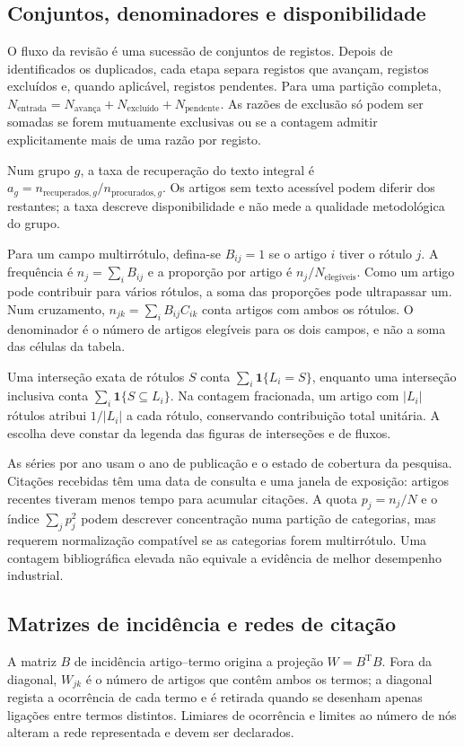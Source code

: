 \subsection{Conjuntos, denominadores e disponibilidade}
\label{sec:mat-contagens}
O fluxo da revisão é uma sucessão de conjuntos de registos. Depois de identificados os duplicados, cada etapa separa registos que avançam, registos excluídos e, quando aplicável, registos pendentes. Para uma partição completa, $N_{\mathrm{entrada}}=N_{\mathrm{avança}}+N_{\mathrm{excluído}}+N_{\mathrm{pendente}}$. As razões de exclusão só podem ser somadas se forem mutuamente exclusivas ou se a contagem admitir explicitamente mais de uma razão por registo.

Num grupo $g$, a taxa de recuperação do texto integral é $a_g=n_{\mathrm{recuperados},g}/n_{\mathrm{procurados},g}$. Os artigos sem texto acessível podem diferir dos restantes; a taxa descreve disponibilidade e não mede a qualidade metodológica do grupo.

Para um campo multirrótulo, defina-se $B_{ij}=1$ se o artigo $i$ tiver o rótulo $j$. A frequência é $n_j=\sum_iB_{ij}$ e a proporção por artigo é $n_j/N_{\mathrm{elegíveis}}$. Como um artigo pode contribuir para vários rótulos, a soma das proporções pode ultrapassar um. Num cruzamento, $n_{jk}=\sum_iB_{ij}C_{ik}$ conta artigos com ambos os rótulos. O denominador é o número de artigos elegíveis para os dois campos, e não a soma das células da tabela.

Uma interseção exata de rótulos $S$ conta $\sum_i\mathbf1\{L_i=S\}$, enquanto uma interseção inclusiva conta $\sum_i\mathbf1\{S\subseteq L_i\}$. Na contagem fracionada, um artigo com $|L_i|$ rótulos atribui $1/|L_i|$ a cada rótulo, conservando contribuição total unitária. A escolha deve constar da legenda das figuras de interseções e de fluxos.

As séries por ano usam o ano de publicação e o estado de cobertura da pesquisa. Citações recebidas têm uma data de consulta e uma janela de exposição: artigos recentes tiveram menos tempo para acumular citações. A quota $p_j=n_j/N$ e o índice $\sum_jp_j^2$ podem descrever concentração numa partição de categorias, mas requerem normalização compatível se as categorias forem multirrótulo. Uma contagem bibliográfica elevada não equivale a evidência de melhor desempenho industrial.

\subsection{Matrizes de incidência e redes de citação}
\label{sec:mat-redes}
A matriz $B$ de incidência artigo--termo origina a projeção $W=B^{\mathrm T}B$. Fora da diagonal, $W_{jk}$ é o número de artigos que contêm ambos os termos; a diagonal regista a ocorrência de cada termo e é retirada quando se desenham apenas ligações entre termos distintos. Limiares de ocorrência e limites ao número de nós alteram a rede representada e devem ser declarados.

